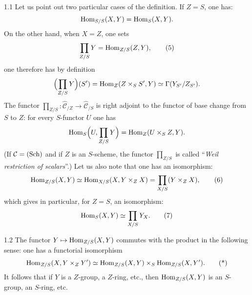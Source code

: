 \begin{definition}{1.1}
Let us point out two particular cases of the definition. If \(Z=S\), one
has:
\[
\operatorname{Hom}_{S/S}(X,Y)=\operatorname{Hom}_S(X,Y).
\]
On the other hand, when \(X=Z\), one sets
\begin{equation}
\prod_{Z/S}Y=\operatorname{Hom}_{Z/S}(Z,Y),
\tag{5}
\end{equation}
one therefore has by definition
\[
\Bigl(\prod_{Z/S}Y\Bigr)(S')
=\operatorname{Hom}_Z(Z\times_S S',Y)
\simeq\Gamma(Y_{S'}/Z_{S'}).
\]
The functor
\(\prod_{Z/S}\colon\widehat{\mathcal{C}}_{/Z}\to\widehat{\mathcal{C}}_{/S}\)
is right adjoint to the functor of base change from \(S\) to \(Z\): for every
\(S\)-functor \(U\) one has
\[
\operatorname{Hom}_S\Bigl(U,\prod_{Z/S}Y\Bigr)
=\operatorname{Hom}_Z(U\times_S Z,Y).
\]
(If \(\mathcal{C}=\textup{(Sch)}\) and if \(Z\) is an \(S\)-scheme, the functor
\(\prod_{Z/S}\) is called ``\emph{Weil restriction of scalars}''.)%
{\renewcommand{\thefootnote}{(3)}}
Let us also note that one has an isomorphism:
\begin{equation}
\operatorname{Hom}_{Z/S}(X,Y)
\simeq
\operatorname{Hom}_{X/S}(X,Y\times_Z X)
=\prod_{X/S}(Y\times_Z X),
\tag{6}
\end{equation}
which gives in particular, for \(Z=S\), an isomorphism:
\begin{equation}
\operatorname{Hom}_S(X,Y)\simeq\prod_{X/S}Y_X.
\tag{7}
\end{equation}
\end{definition}

\begin{remark}{1.2}
\label{II.1.2}
The functor \(Y\mapsto\operatorname{Hom}_{Z/S}(X,Y)\) commutes with the product in the
following sense: one has a functorial isomorphism
\begin{equation}
\operatorname{Hom}_{Z/S}(X,Y\times_Z Y')
\simeq
\operatorname{Hom}_{Z/S}(X,Y)\times_S\operatorname{Hom}_{Z/S}(X,Y').
\tag{*}
\end{equation}
It follows that if \(Y\) is a \(Z\)-group, \resp a \(Z\)-ring, etc., then
\(\operatorname{Hom}_{Z/S}(X,Y)\) is an \(S\)-group, \resp an \(S\)-ring, etc.
\end{remark}

